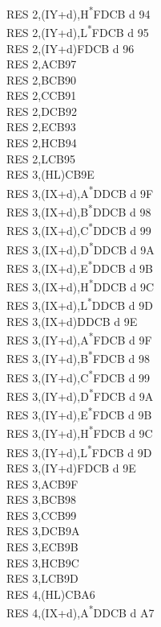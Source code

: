 \documentclass[twoside,openright,a4paper]{book}
\begin{document}
\begin{multicols}{3}
{\begin{tabbing}
	RES 2,(IY+d),H\textsuperscript{*}\>FDCB d 94\\
	RES 2,(IY+d),L\textsuperscript{*}\>FDCB d 95\\
	RES 2,(IY+d)\>FDCB d 96\\
	RES 2,A\>CB97\\
	RES 2,B\>CB90\\
	RES 2,C\>CB91\\
	RES 2,D\>CB92\\
	RES 2,E\>CB93\\
	RES 2,H\>CB94\\
	RES 2,L\>CB95\\
	RES 3,(HL)\>CB9E\\
	RES 3,(IX+d),A\textsuperscript{*}\>DDCB d 9F\\
	RES 3,(IX+d),B\textsuperscript{*}\>DDCB d 98\\
	RES 3,(IX+d),C\textsuperscript{*}\>DDCB d 99\\
	RES 3,(IX+d),D\textsuperscript{*}\>DDCB d 9A\\
	RES 3,(IX+d),E\textsuperscript{*}\>DDCB d 9B\\
	RES 3,(IX+d),H\textsuperscript{*}\>DDCB d 9C\\
	RES 3,(IX+d),L\textsuperscript{*}\>DDCB d 9D\\
	RES 3,(IX+d)\>DDCB d 9E\\
	RES 3,(IY+d),A\textsuperscript{*}\>FDCB d 9F\\
	RES 3,(IY+d),B\textsuperscript{*}\>FDCB d 98\\
	RES 3,(IY+d),C\textsuperscript{*}\>FDCB d 99\\
	RES 3,(IY+d),D\textsuperscript{*}\>FDCB d 9A\\
	RES 3,(IY+d),E\textsuperscript{*}\>FDCB d 9B\\
	RES 3,(IY+d),H\textsuperscript{*}\>FDCB d 9C\\
	RES 3,(IY+d),L\textsuperscript{*}\>FDCB d 9D\\
	RES 3,(IY+d)\>FDCB d 9E\\
	RES 3,A\>CB9F\\
	RES 3,B\>CB98\\
	RES 3,C\>CB99\\
	RES 3,D\>CB9A\\
	RES 3,E\>CB9B\\
	RES 3,H\>CB9C\\
	RES 3,L\>CB9D\\
	RES 4,(HL)\>CBA6\\
	RES 4,(IX+d),A\textsuperscript{*}\>DDCB d A7\\

\end{tabbing}}
\end{multicols}
\end{document}
